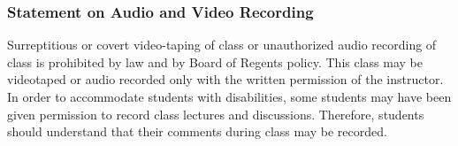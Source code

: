 \documentclass[]{article}
\begin{document}
\subsubsection{Statement on Audio and Video
Recording}\label{statement-on-audio-and-video-recording}

Surreptitious or covert video-taping of class or unauthorized audio
recording of class is prohibited by law and by Board of Regents policy.
This class may be videotaped or audio recorded only with the written
permission of the instructor. In order to accommodate students with
disabilities, some students may have been given permission to record
class lectures and discussions. Therefore, students should understand
that their comments during class may be recorded.
\end{document}
